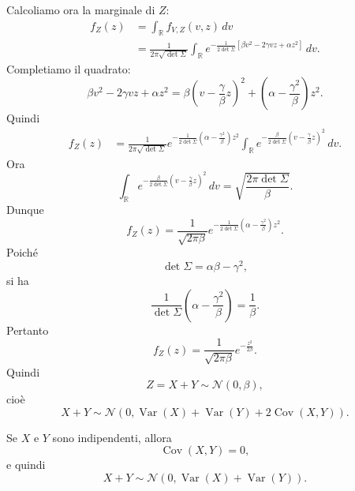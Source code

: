 \documentclass[a4paper]{article}
\begin{document}
\begin{snippetexercise}{}
    Calcoliamo ora la marginale di \(Z\):
    \begin{align*}
        f_Z(z)
        &=
        \int_{\mathbb R} f_{V,Z}(v,z)\,dv \\
        &=
        \frac{1}{2\pi\sqrt{\det \Sigma}}
        \int_{\mathbb R}
        e^{
            -\frac{1}{2\det \Sigma}
            \left[
                \beta v^2 - 2\gamma vz + \alpha z^2
            \right]
        }
        \,dv.
    \end{align*}
    Completiamo il quadrato:
    \[
        \beta v^2 - 2\gamma vz + \alpha z^2
        =
        \beta
        \left(
            v - \frac{\gamma}{\beta}z
        \right)^2
        +
        \left(
            \alpha - \frac{\gamma^2}{\beta}
        \right)z^2.
    \]
    Quindi
    \begin{align*}
        f_Z(z)
        &=
        \frac{1}{2\pi\sqrt{\det \Sigma}}
        e^{
            -\frac{1}{2\det \Sigma}
            \left(
                \alpha - \frac{\gamma^2}{\beta}
            \right)z^2
        }
        \int_{\mathbb R}
        e^{
            -\frac{\beta}{2\det \Sigma}
            \left(
                v - \frac{\gamma}{\beta}z
            \right)^2
        }
        \,dv.
    \end{align*}
    Ora
    \[
        \int_{\mathbb R}
        e^{
            -\frac{\beta}{2\det \Sigma}
            \left(
                v - \frac{\gamma}{\beta}z
            \right)^2
        }
        \,dv
        =
        \sqrt{\frac{2\pi \det \Sigma}{\beta}}.
    \]
    Dunque
    \[
        f_Z(z)
        =
        \frac{1}{\sqrt{2\pi\beta}}
        e^{
            -\frac{1}{2\det \Sigma}
            \left(
                \alpha - \frac{\gamma^2}{\beta}
            \right)z^2
        }.
    \]
    Poiché
    \[
        \det \Sigma = \alpha\beta - \gamma^2,
    \]
    si ha
    \[
        \frac{1}{\det \Sigma}
        \left(
            \alpha - \frac{\gamma^2}{\beta}
        \right)
        =
        \frac{1}{\beta}.
    \]
    Pertanto
    \[
        f_Z(z)
        =
        \frac{1}{\sqrt{2\pi\beta}}
        e^{-\frac{z^2}{2\beta}}.
    \]
    Quindi
    \[
        Z = X+Y \sim \mathcal N(0,\beta),
    \]
    cioè
    \[
        X+Y
        \sim
        \mathcal N
        \left(
            0,
            \operatorname{Var}(X)
            +
            \operatorname{Var}(Y)
            +
            2\operatorname{Cov}(X,Y)
        \right).
    \]

    Se \(X\) e \(Y\) sono indipendenti, allora
    \[
        \operatorname{Cov}(X,Y)=0,
    \]
    e quindi
    \[
        X+Y
        \sim
        \mathcal N
        \left(
            0,
            \operatorname{Var}(X)+\operatorname{Var}(Y)
        \right).
    \]
\end{snippetexercise}
\end{document}
